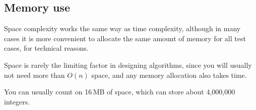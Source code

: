 \subsection{Memory use}

Space complexity works the same way as time complexity,
although in many cases it is more convenient to allocate the same amount
of memory for all test cases, for technical reasons.

Space is rarely the limiting factor in designing algorithms,
since you will usually not need more than $O(n)$ space,
and any memory allocation also takes time.

You can usually count on 16\,MB of space, which can store about
4,000,000 integers.
